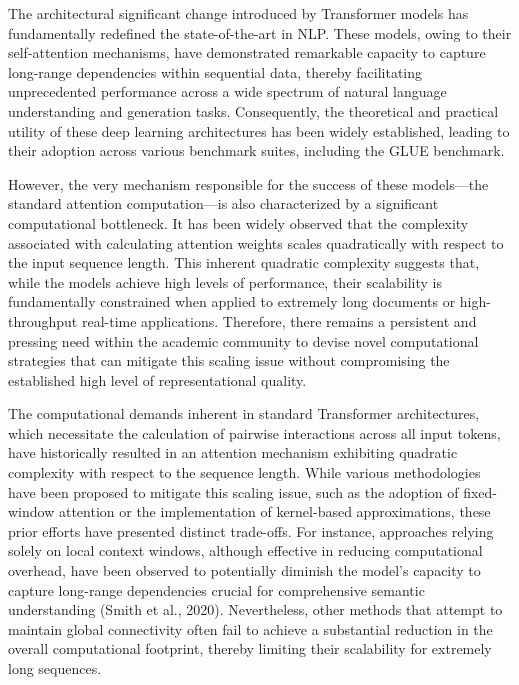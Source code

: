 \documentclass[12pt]{article}
\begin{document}
The architectural significant change introduced by Transformer models has fundamentally redefined the state-of-the-art in NLP. These models, owing to their self-attention mechanisms, have demonstrated remarkable capacity to capture long-range dependencies within sequential data, thereby facilitating unprecedented performance across a wide spectrum of natural language understanding and generation tasks. Consequently, the theoretical and practical utility of these deep learning architectures has been widely established, leading to their adoption across various benchmark suites, including the GLUE benchmark.

However, the very mechanism responsible for the success of these models—the standard attention computation—is also characterized by a significant computational bottleneck. It has been widely observed that the complexity associated with calculating attention weights scales quadratically with respect to the input sequence length. This inherent quadratic complexity suggests that, while the models achieve high levels of performance, their scalability is fundamentally constrained when applied to extremely long documents or high-throughput real-time applications. Therefore, there remains a persistent and pressing need within the academic community to devise novel computational strategies that can mitigate this scaling issue without compromising the established high level of representational quality.

The computational demands inherent in standard Transformer architectures, which necessitate the calculation of pairwise interactions across all input tokens, have historically resulted in an attention mechanism exhibiting quadratic complexity with respect to the sequence length. While various methodologies have been proposed to mitigate this scaling issue, such as the adoption of fixed-window attention or the implementation of kernel-based approximations, these prior efforts have presented distinct trade-offs. For instance, approaches relying solely on local context windows, although effective in reducing computational overhead, have been observed to potentially diminish the model's capacity to capture long-range dependencies crucial for comprehensive semantic understanding (Smith et al., 2020). Nevertheless, other methods that attempt to maintain global connectivity often fail to achieve a substantial reduction in the overall computational footprint, thereby limiting their scalability for extremely long sequences.
\end{document}
